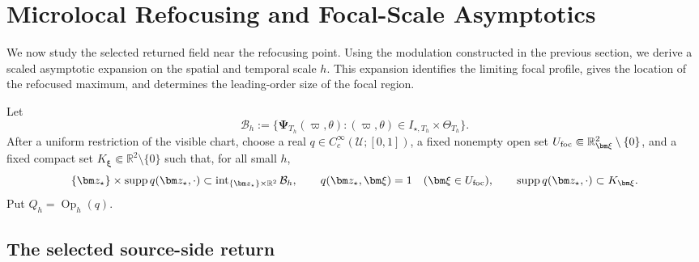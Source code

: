 \documentclass[11pt,reqno]{amsart}
\newcommand{\Op}{\operatorname{Op}}
\newcommand{\supp}{\operatorname{supp}}
\numberwithin{equation}{section}
\begin{document}
\section{Microlocal Refocusing and Focal-Scale Asymptotics}\label{sec:causal-refocusing}

We now study the selected returned field near the refocusing point. Using the modulation constructed in the previous section, we derive a scaled asymptotic expansion on the spatial and temporal scale $h$. This expansion identifies the limiting focal profile, gives the location of the refocused maximum, and determines the leading-order size of the focal region.

Let
\begin{equation*}
 \mathcal B_h:=\{\bm\Psi_{T_h}(\varpi,\theta):(\varpi,\theta)\in I_{\star,T_h}\times\Theta_{T_h}\}.
\end{equation*}
After a uniform restriction of the visible chart, choose a real $q\in C_c^\infty(\mathcal U;[0,1])$, a fixed nonempty open set $U_{\rm foc}\Subset\mathbb R_{\bm\xi}^2\setminus\{0\}$, and a fixed compact set $K_{\bm\xi}\Subset\mathbb R^2\setminus\{0\}$ such that, for all small $h$,
\begin{equation*}
 \{\bm z_\star\}\times\supp q(\bm z_\star,\cdot)\subset\operatorname{int}_{\{\bm z_\star\}\times\mathbb R^2}\mathcal B_h,
 \qquad
 q(\bm z_\star,\bm\xi)=1\quad(\bm\xi\in U_{\rm foc}), \qquad \supp q(\bm z_\star,\cdot)\subset K_{\bm\xi}.
\end{equation*}
Put $Q_h=\Op_h(q)$.

\subsection{The selected source-side return}
\end{document}
